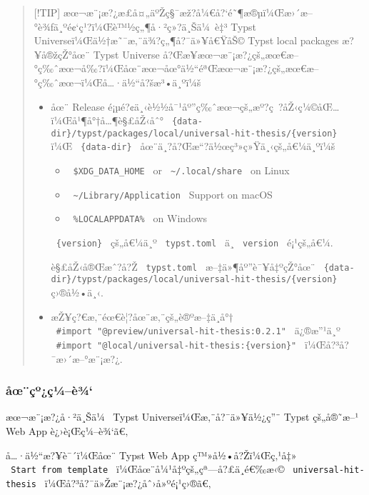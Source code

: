 \begin{quote}
{[}!TIP{]}
æœ¬æ¨¡æ?¿æ­£å¤„äºŽç§¯æž?å¼€å?{}`é˜¶æ®µï¼Œæ›´æ--°è¾ƒä¸ºé¢`ç¹?ï¼Œè™½ç„¶å·²ç»?ä¸Šä¼~è‡³
Typst Universeï¼Œä½†æ˜¯æ‚¨ä¾?ç„¶å?¯ä»¥å€ŸåŠ© Typst local packages
æ?¥å®žçŽ°åœ¨ Typst Universe
å?Œæ­¥æœ¬æ¨¡æ?¿çš„æœ€æ--°ç‰ˆæœ¬å‰?ï¼Œåœ¨æœ¬åœ°ä½``éªŒæœ¬æ¨¡æ?¿çš„æœ€æ--°ç‰ˆæœ¬ï¼Œå\ldots·ä½``å?šæ³•ä¸ºï¼š

\begin{itemize}
\item
  åœ¨ Release
  é¡µé?¢ä¸‹è½½å¯¹åº''ç‰ˆæœ¬çš„æº?ç~?åŽ‹ç¼©åŒ\ldots ï¼Œå¹¶å°†å\ldots¶è§£åŽ‹åˆ°
  \texttt{\ \{data-dir\}/typst/packages/local/universal-hit-thesis/\{version\}\ }
  ï¼Œ \texttt{\ \{data-dir\}\ } åœ¨ä¸?å?Œæ``?ä½œç³»ç»Ÿä¸‹çš„å€¼ä¸ºï¼š

  \begin{itemize}
  \tightlist
  \item
    \texttt{\ \$XDG\_DATA\_HOME\ } or
    \texttt{\ \textasciitilde{}/.local/share\ } on Linux
  \item
    \texttt{\ \textasciitilde{}/Library/Application\ } Support on macOS
  \item
    \texttt{\ \%LOCALAPPDATA\%\ } on Windows
  \end{itemize}

  \texttt{\ \{version\}\ } çš„å€¼ä¸º \texttt{\ typst.toml\ } ä¸­
  \texttt{\ version\ } é¡¹çš„å€¼.

  è§£åŽ‹å®Œæˆ?å?Ž \texttt{\ typst.toml\ } æ--‡ä»¶åº''è¯¥å‡ºçŽ°åœ¨
  \texttt{\ \{data-dir\}/typst/packages/local/universal-hit-thesis/\{version\}\ }
  ç›®å½•ä¸‹.
\item
  æŽ¥ç?€æ‚¨éœ€è¦?åœ¨æ‚¨çš„è®ºæ--‡ä¸­å°†
  \texttt{\ \#import\ "@preview/universal-hit-thesis:0.2.1"\ }
  ä¿®æ''¹ä¸º
  \texttt{\ \#import\ "@local/universal-hit-thesis:\{version\}"\ }
  ï¼Œå?³å?¯æ›´æ--°æ¨¡æ?¿.
\end{itemize}
\end{quote}

\subsubsection{åœ¨çº¿ç¼--è¾`}\label{uxe5ux153uxe7uxbauxe7uxbcuxe8uxbe}

æœ¬æ¨¡æ?¿å·²ä¸Šä¼~ Typst Universeï¼Œæ‚¨å?¯ä»¥ä½¿ç''¨ Typst çš„å®˜æ--¹
Web App è¿›è¡Œç¼--è¾`ã€‚

å\ldots·ä½``æ?¥è¯´ï¼Œåœ¨ Typst Web App ç™»å½•å?Žï¼Œç‚¹å‡»
\texttt{\ Start\ from\ template\ } ï¼Œåœ¨å¼¹å‡ºçš„çª---å?£ä¸­é€‰æ‹©
\texttt{\ universal-hit-thesis\ } ï¼Œå?³å?¯ä»Žæ¨¡æ?¿åˆ›å»ºé¡¹ç›®ã€‚

